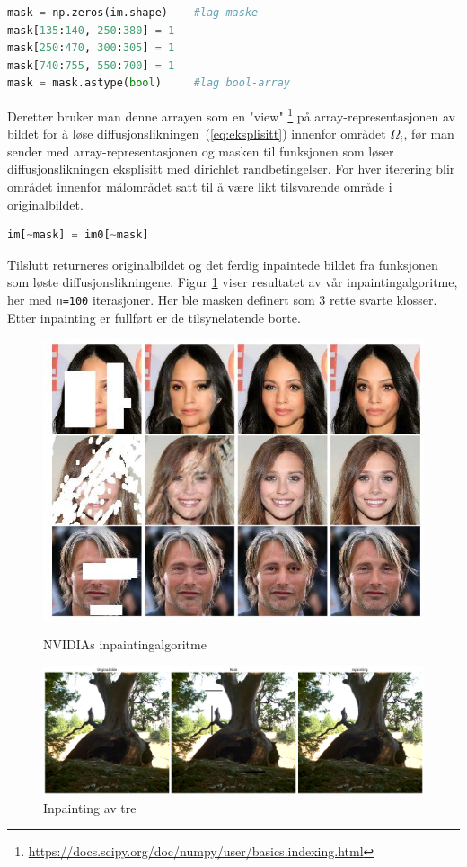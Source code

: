 \begin{lstlisting}[language=Python]
mask = np.zeros(im.shape)    #lag maske
mask[135:140, 250:380] = 1
mask[250:470, 300:305] = 1
mask[740:755, 550:700] = 1
mask = mask.astype(bool)     #lag bool-array
\end{lstlisting}
 
Deretter bruker man denne arrayen som en "view" \footnote{\url{https://docs.scipy.org/doc/numpy/user/basics.indexing.html}} på array-representasjonen av bildet for å løse diffusjonslikningen~(\ref{eq:eksplisitt}) innenfor området $\Omega_i$, før man sender med array-representasjonen og masken til funksjonen som løser diffusjonslikningen eksplisitt med dirichlet randbetingelser. For hver iterering blir området innenfor målområdet satt til å være likt tilsvarende område i originalbildet.
\begin{lstlisting}[language=Python]
    im[~mask] = im0[~mask]
\end{lstlisting}
Tilslutt returneres originalbildet og det ferdig inpaintede bildet fra funksjonen som løste diffusjonslikningene. Figur \ref{fig:inpaint} viser resultatet av vår inpaintingalgoritme, her med \texttt{n=100} iterasjoner. Her ble masken definert som 3 rette svarte klosser. Etter inpainting er fullført er de tilsynelatende borte.
\begin{figure}
\begin{center}
    \includegraphics[width=0.4\columnwidth]{bilder/nvidia-image-inpainting-demo.jpg}
    \caption{NVIDIAs inpaintingalgoritme~ \label{fig:nvidia}}
    \includegraphics[width=1\columnwidth]{bilder/tree_inpaint.png}
    \caption{Inpainting av tre~ \label{fig:inpaint}}
\end{center}
\end{figure}
